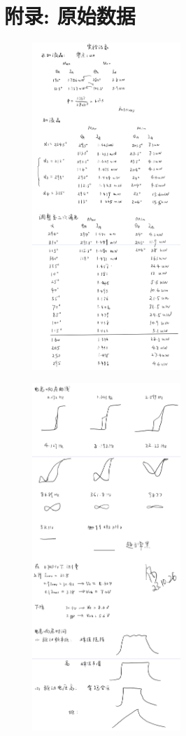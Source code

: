 \documentclass[12pt,a4paper]{article}
\begin{document}
\section{附录: 原始数据}
\begin{figure}[H]
    \centering
    \includegraphics[width=0.5\textwidth]{数据1.jpg}
\end{figure}
\begin{figure}[H]
    \centering
\includegraphics[width=0.5\textwidth]{数据2.jpg}
\end{figure}
\end{document}
